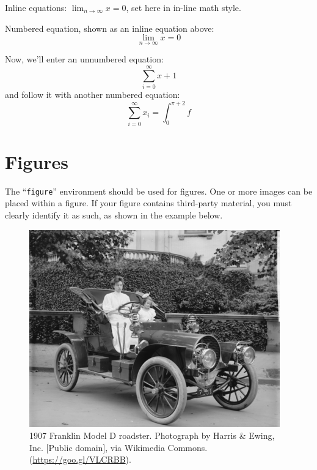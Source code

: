 \documentclass[sigconf,natbib=false]{acmart}
\begin{document}
Inline equations: 
\begin{math}
  \lim_{n\rightarrow \infty}x=0
\end{math},
set here in in-line math style.

Numbered equation, shown as an inline equation above:
\begin{equation}
  \lim_{n\rightarrow \infty}x=0
\end{equation}

Now, we'll enter an unnumbered equation:
\begin{displaymath}
  \sum_{i=0}^{\infty} x + 1
\end{displaymath}
and follow it with another numbered equation:
\begin{equation}
  \sum_{i=0}^{\infty}x_i=\int_{0}^{\pi+2} f
\end{equation}

\section{Figures}

The ``\verb|figure|'' environment should be used for figures. One or
more images can be placed within a figure. If your figure contains
third-party material, you must clearly identify it as such, as shown
in the example below.


\begin{figure}[h]
  \centering
  \includegraphics[width=\linewidth]{figs/sample-franklin}
  \caption{1907 Franklin Model D roadster. Photograph by Harris \&
    Ewing, Inc. [Public domain], via Wikimedia
    Commons. (\url{https://goo.gl/VLCRBB}).}
\end{figure}
\end{document}
